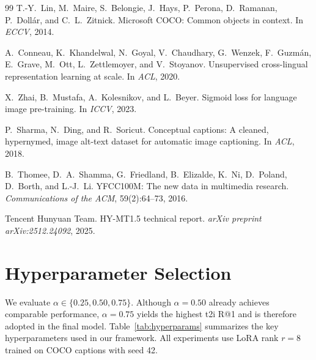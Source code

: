 \documentclass[10pt,leqno]{amsart}
\begin{document}
\begin{thebibliography}{99}
T.-Y.~Lin, M.~Maire, S.~Belongie, J.~Hays, P.~Perona, D.~Ramanan, P.~Dollár, and C.~L.~Zitnick.
\newblock Microsoft COCO: Common objects in context.
\newblock In \textit{ECCV}, 2014.

A.~Conneau, K.~Khandelwal, N.~Goyal, V.~Chaudhary, G.~Wenzek, F.~Guzmán, E.~Grave, M.~Ott, L.~Zettlemoyer, and V.~Stoyanov.
\newblock Unsupervised cross-lingual representation learning at scale.
\newblock In \textit{ACL}, 2020.

X.~Zhai, B.~Mustafa, A.~Kolesnikov, and L.~Beyer.
\newblock Sigmoid loss for language image pre-training.
\newblock In \textit{ICCV}, 2023.

P.~Sharma, N.~Ding, and R.~Soricut.
\newblock Conceptual captions: A cleaned, hypernymed, image alt-text dataset for
  automatic image captioning.
\newblock In \textit{ACL}, 2018.

B.~Thomee, D.~A.~Shamma, G.~Friedland, B.~Elizalde, K.~Ni, D.~Poland,
  D.~Borth, and L.-J.~Li.
\newblock YFCC100M: The new data in multimedia research.
\newblock \textit{Communications of the ACM}, 59(2):64--73, 2016.

Tencent Hunyuan Team.
\newblock HY-MT1.5 technical report.
\newblock \textit{arXiv preprint arXiv:2512.24092}, 2025.

\end{thebibliography}

\section{Hyperparameter Selection}

We evaluate $\alpha \in \{0.25, 0.50, 0.75\}$. Although $\alpha{=}0.50$ already achieves comparable performance, $\alpha{=}0.75$ yields the highest t2i R@1 and is therefore adopted in the final model. Table~\ref{tab:hyperparams} summarizes the key hyperparameters used in our framework. All experiments use LoRA rank $r=8$ trained on COCO captions with seed 42.
\end{document}
